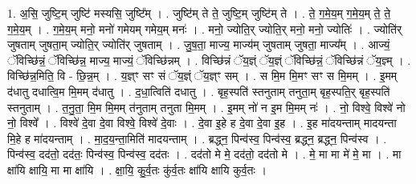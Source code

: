 \documentclass[17pt]{extarticle}
\begin{document}
1. अ॒सि॒ जुष्टि॒म् जुष्टि॑ मस्यसि॒ जुष्टि᳚म् । . जुष्टि॑म् ते ते॒ जुष्टि॒म् जुष्टि॑म् ते । . ते॒ ग॒मे॒य॒म् ग॒मे॒य॒म् ते॒ ते॒ ग॒मे॒य॒म् । . ग॒मे॒य॒म् मनो॒ मनो॑ गमेयम् गमेय॒म् मनः॑ । . मनो॒ ज्योति॒र् ज्योति॒र् मनो॒ मनो॒ ज्योतिः॑ । . ज्योति॑र् जुषताम् जुषता॒म् ज्योति॒र् ज्योति॑र् जुषताम् । . जु॒ष॒ता॒ माज्य॒ माज्य॑म् जुषताम् जुषता॒ माज्य᳚म् । . आज्यं॒ ॅविच्छि॑न्नं॒ ॅविच्छि॑न्न॒ माज्य॒ माज्यं॒ ॅविच्छि॑न्नम् । . विच्छि॑न्नं ॅय॒ज्ञ्ं ॅय॒ज्ञ्ं ॅविच्छि॑न्नं॒ ॅविच्छि॑न्नं ॅय॒ज्ञ्म् । . विच्छि॑न्न॒मिति॒ वि - छि॒न्न॒म् । . य॒ज्ञ्ꣳ सꣳ सं ॅय॒ज्ञ्ं ॅय॒ज्ञ्ꣳ सम् । . स मि॒म मि॒मꣳ सꣳ स मि॒मम् । . इ॒मम् द॑धातु दधात्वि॒म मि॒मम् द॑धातु । . द॒धा॒त्विति॑ दधातु । . बृह॒स्पति॑ स्तनुताम् तनुता॒म् बृह॒स्पति॒र् बृह॒स्पति॑ स्तनुताम् । . त॒नु॒ता॒ मि॒म मि॒मम् त॑नुताम् तनुता मि॒मम् । . इ॒मम् नो॑ न इ॒म मि॒मम् नः॑ । . नो॒ विश्वे॒ विश्वे॑ नो नो॒ विश्वे᳚ । . विश्वे॑ दे॒वा दे॒वा विश्वे॒ विश्वे॑ दे॒वाः । . दे॒वा इ॒हे ह दे॒वा दे॒वा इ॒ह । . इ॒ह मा॑दयन्ताम् मादयन्ता मि॒हे ह मा॑दयन्ताम् । . मा॒द॒य॒न्ता॒मिति॑ मादयन्ताम् । . ब्रद्ध्न॒ पिन्व॑स्व॒ पिन्व॑स्व॒ ब्रद्ध्न॒ ब्रद्ध्न॒ पिन्व॑स्व । . पिन्व॑स्व॒ दद॑तो॒ दद॑तः॒ पिन्व॑स्व॒ पिन्व॑स्व॒ दद॑तः । . दद॑तो मे मे॒ दद॑तो॒ दद॑तो मे । . मे॒ मा मा मे॑ मे॒ मा । . मा क्षा॑यि क्षायि॒ मा मा क्षा॑यि । . क्षा॒यि॒ कु॒र्व॒तः कु॑र्व॒तः क्षा॑यि क्षायि कुर्व॒तः । \newline
\end{document}
